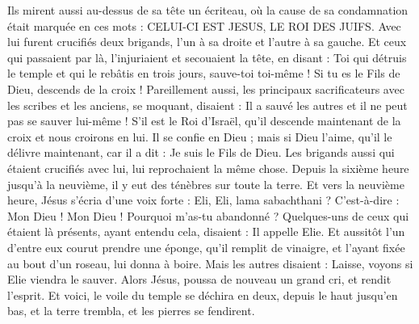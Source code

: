 \begin{multicols}{2}
Ils mirent aussi au-dessus de sa tête un écriteau, où la cause de sa condamnation était marquée en ces mots : CELUI-CI EST JESUS, LE ROI DES JUIFS.
Avec lui furent crucifiés deux brigands, l'un à sa droite et l'autre à sa gauche.
Et ceux qui passaient par là, l'injuriaient et secouaient la tête,
en disant : Toi qui détruis le temple et qui le rebâtis en trois jours, sauve-toi toi-même ! Si tu es le Fils de Dieu, descends de la croix !
Pareillement aussi, les principaux sacrificateurs avec les scribes et les anciens, se moquant, disaient :
Il a sauvé les autres et il ne peut pas se sauver lui-même ! S'il est le Roi d'Israël, qu'il descende maintenant de la croix et nous croirons en lui.
Il se confie en Dieu ; mais si Dieu l'aime, qu'il le délivre maintenant, car il a dit : Je suis le Fils de Dieu.
Les brigands aussi qui étaient crucifiés avec lui, lui reprochaient la même chose.
Depuis la sixième heure jusqu'à la neuvième, il y eut des ténèbres sur toute la terre.
Et vers la neuvième heure, Jésus s'écria d'une voix forte : Eli, Eli, lama sabachthani ? C'est-à-dire : Mon Dieu ! Mon Dieu ! Pourquoi m'as-tu abandonné ?
Quelques-uns de ceux qui étaient là présents, ayant entendu cela, disaient : Il appelle Elie.
Et aussitôt l'un d'entre eux courut prendre une éponge, qu'il remplit de vinaigre, et l'ayant fixée au bout d'un roseau, lui donna à boire.
Mais les autres disaient : Laisse, voyons si Elie viendra le sauver.
Alors Jésus, poussa de nouveau un grand cri, et rendit l'esprit.
Et voici, le voile du temple se déchira en deux, depuis le haut jusqu'en bas, et la terre trembla, et les pierres se fendirent.

\end{multicols}
